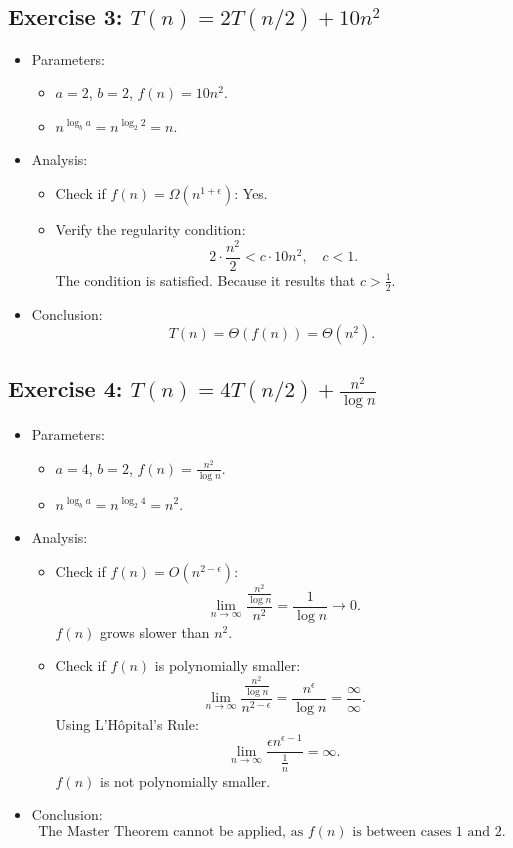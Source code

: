 \subsection{Exercise 3: \(T(n) = 2T(n/2) + 10n^2\)}

\begin{itemize}
    \item Parameters:
    \begin{itemize}
        \item \(a = 2\), \(b = 2\), \(f(n) = 10n^2\).
        \item \(n^{\log_b a} = n^{\log_2 2} = n\).
    \end{itemize}
    \item Analysis:
    \begin{itemize}
        \item Check if \(f(n) = \Omega(n^{1+\epsilon})\): Yes.
        \item Verify the regularity condition:
        \[
        2 \cdot \frac{n^2}{2} < c \cdot 10n^2, \quad c < 1.
        \]
        The condition is satisfied. Because it results that $c > \frac{1}{2}$.
    \end{itemize}
    \item Conclusion:
    \[
    T(n) = \Theta(f(n)) = \Theta(n^2).
    \]
\end{itemize}

\subsection{Exercise 4: \(T(n) = 4T(n/2) + \frac{n^2}{\log n}\)}

\begin{itemize}
    \item Parameters:
    \begin{itemize}
        \item \(a = 4\), \(b = 2\), \(f(n) = \frac{n^2}{\log n}\).
        \item \(n^{\log_b a} = n^{\log_2 4} = n^2\).
    \end{itemize}
    \item Analysis:
    \begin{itemize}
        \item Check if \(f(n) = O(n^{2-\epsilon})\):
        \[
        \lim_{n \to \infty} \frac{\frac{n^2}{\log n}}{n^2} = \frac{1}{\log n} \to 0.
        \]
        \(f(n)\) grows slower than \(n^2\).
        \item Check if \(f(n)\) is polynomially smaller:
        \[
        \lim_{n \to \infty} \frac{\frac{n^2}{\log n}}{n^{2-\epsilon}} = \frac{n^\epsilon}{\log n} = \frac{\infty}{\infty}.
        \]
        Using L'Hôpital's Rule:
        \[
        \lim_{n \to \infty} \frac{\epsilon n^{\epsilon - 1}}{\frac{1}{n}} = \infty.
        \]
        \(f(n)\) is not polynomially smaller.
    \end{itemize}
    \item Conclusion:
    \[
    \text{The Master Theorem cannot be applied, as \(f(n)\) is between cases 1 and 2.}
    \]
\end{itemize}

